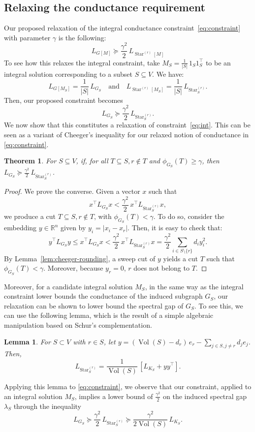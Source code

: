 \documentclass{article}
\newtheorem{theorem}{Theorem}[section]
\newtheorem{lemma}{Lemma}[section]
\DeclareMathOperator{\Vol}{Vol}
\DeclareMathOperator{\Star}{Star}
\begin{document}
\subsection{Relaxing the conductance requirement}

Our proposed relaxation of the integral conductance constraint~\eqref{eq:constraint} with parameter $\gamma$ is the following:
\begin{equation}\label{eq:constraint}
L_{G[M]} \succeq \frac{\gamma^2}{2} \,  L_{\Star^{(r)}[M]}
\end{equation}
To see how this relaxes the integral constraint, take $M_S = \frac{1}{|S|} \, 1_S 1_S^\top$ to be an integral solution corresponding to a subset $S \subseteq V$.
We have:
\[ L_{G[M_S]} = \frac{1}{|S|} \, L_{G_S} \quad \textrm{and} \quad L_{\Star^{(r)}[M_S]} = \frac{1}{|S|} \, L_{\Star^{(r)}_S}. \]
Then, our proposed constraint becomes
\[ L_{G_S} \succeq \frac{\gamma^2}{2} \, L_{\Star^{(r)}_S}. \]
We now show that this constitutes a relaxation of constraint~\eqref{eq:int}. This can be seen as a variant of Cheeger's inequality for our relaxed notion of conductance in \eqref{eq:constraint}. 

\begin{theorem}\label{thm:necessity}
  For $S \subseteq V$, if, for all $T \subseteq S, r \notin T$ and $\phi_{G_S}(T) \geq \gamma$, then $L_{G_S} \succeq \frac{\gamma^2}{2} \, L_{\Star^{(r)}_S}$.
\end{theorem}

\begin{proof}
  We prove the converse. Given a vector $x$ such that
  \[ x^\top L_{G_S} x < \frac{\gamma^2}{2} \, x^\top L_{\Star^{(r)}_S} x, \]
  we produce a cut $T \subseteq S, r \notin T$, with $\phi_{G_S}(T) < \gamma$. To do so, consider the embedding $y \in \mathbb{R}^n$ given by $y_i = |x_i - x_r|$. Then, it is easy to check that:
  \[ y^\top L_{G_S} y \leq x^\top L_{G_S} x < \frac{\gamma^2}{2} \, x^\top L_{\Star^{(r)}_S} x = \frac{\gamma^2}{2} \sum_{i \in S \setminus \{r\}} d_i y_i^2. \]
  By Lemma~\ref{lem:cheeger-rounding}, a sweep cut of $y$ yields a cut $T$ such that $\phi_{G_S}(T) < \gamma$.
  Moreover, because $y_r = 0$, $r$ does not belong to $T$.
\end{proof}

Moreover, for a candidate integral solution $M_S$, in the same way as the integral constraint lower bounds the conductance of the induced subgraph $G_S$, our relaxation can be shown to lower bound the spectral gap of $G_S$. To see this, we can use the following lemma, which is the result of a simple algebraic manipulation based on Schur's complementation.
\begin{lemma}\label{lemma:star}
  For $S \subset V$ with $r \in S$, let $y = (\Vol(S) - d_r) \,  e_r - \sum_{j \in S, j \neq r} d_j e_j$. Then,
  \[ L_{\Star^{(r)}_S} = \frac{1}{\Vol(S)} \, \left[ L_{K_S} + y y^\top \right]. \]
\end{lemma}
Applying this lemma to \eqref{eq:constraint}, we observe that our constraint, applied to an integral solution $M_S$, implies a lower bound of $\frac{\gamma^2}{2}$ on the induced spectral gap $\lambda_S$ through the inequality
\[ L_{G_S} \succeq \frac{\gamma^2}{2} \, L_{\Star^{(r)}_S} \succeq \frac{\gamma^2}{2\Vol(S)} \, L_{K_S}. \]
\end{document}
